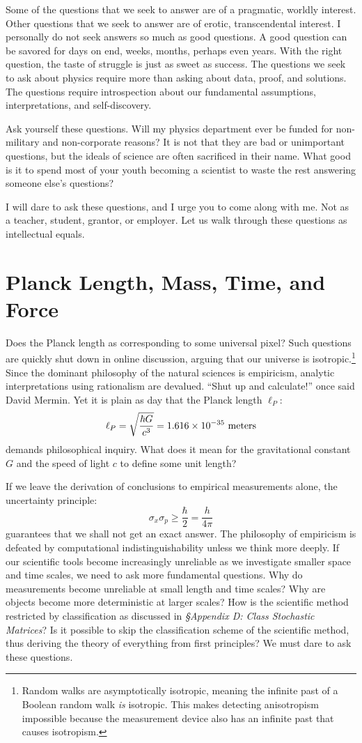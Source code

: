 \documentclass[10pt, a5paper, twoside, openright]{memoir}
\begin{document}
Some of the questions that we seek to answer are of a pragmatic, worldly interest. Other questions that we seek to answer are of erotic, transcendental interest. I personally do not seek answers so much as good questions. A good question can be savored for days on end, weeks, months, perhaps even years. With the right question, the taste of struggle is just as sweet as success. The questions we seek to ask about physics require more than asking about data, proof, and solutions. The questions require introspection about our fundamental assumptions, interpretations, and self-discovery.

Ask yourself these questions. Will my physics department ever be funded for non-military and non-corporate reasons? It is not that they are bad or unimportant questions, but the ideals of science are often sacrificed in their name. What good is it to spend most of your youth becoming a scientist to waste the rest answering someone else's questions?

I will dare to ask these questions, and I urge you to come along with me. Not as a teacher, student, grantor, or employer. Let us walk through these questions as intellectual equals.

\section{Planck Length, Mass, Time, and Force}
Does the Planck length as corresponding to some universal pixel? Such questions are quickly shut down in online discussion, arguing that our universe is isotropic.\footnote{Random walks are asymptotically isotropic, meaning the infinite past of a Boolean random walk \textit{is} isotropic. This makes detecting anisotropism impossible because the measurement device also has an infinite past that causes isotropism.} Since the dominant philosophy of the natural sciences is empiricism, analytic interpretations using rationalism are devalued. ``Shut up and calculate!'' once said David Mermin. Yet it is plain as day that the Planck length $\ell_P$:
$$\ell_P = \sqrt{\frac{\hbar G}{c^3}} = 1.616 \times 10^{-35} \ \textnormal{meters}$$
demands philosophical inquiry. What does it mean for the gravitational constant $G$ and the speed of light $c$ to define some unit length?

If we leave the derivation of conclusions to empirical measurements alone, the uncertainty principle:
$$\sigma_x \sigma_p \geq \frac{\hbar}{2} = \frac{h}{4 \pi}$$
guarantees that we shall not get an exact answer. The philosophy of empiricism is defeated by computational indistinguishability unless we think more deeply. If our scientific tools become increasingly unreliable as we investigate smaller space and time scales, we need to ask more fundamental questions. Why do measurements become unreliable at small length and time scales? Why are objects become more deterministic at larger scales? How is the scientific method restricted by classification as discussed in \textit{\S Appendix D: Class Stochastic Matrices}? Is it possible to skip the classification scheme of the scientific method, thus deriving the theory of everything from first principles? We must dare to ask these questions.
\end{document}
